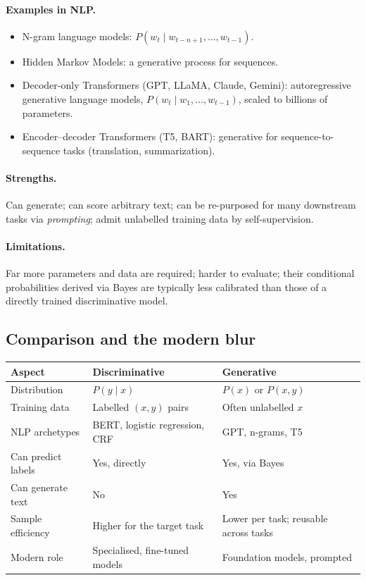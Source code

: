 \documentclass[12pt,a4paper]{report}
\theoremstyle{definition}
\theoremstyle{remark}
\begin{document}
\paragraph{Examples in NLP.}
\begin{itemize}
    \item N-gram language models: $P(w_t \mid w_{t-n+1}, \dots, w_{t-1})$.
    \item Hidden Markov Models: a generative process for sequences.
    \item Decoder-only Transformers (GPT, LLaMA, Claude, Gemini): autoregressive generative language models, $P(w_t \mid w_1, \dots, w_{t-1})$, scaled to billions of parameters.
    \item Encoder--decoder Transformers (T5, BART): generative for sequence-to-sequence tasks (translation, summarization).
\end{itemize}

\paragraph{Strengths.} Can generate; can score arbitrary text; can be re-purposed for many downstream tasks via \emph{prompting}; admit unlabelled training data by self-supervision.

\paragraph{Limitations.} Far more parameters and data are required; harder to evaluate; their conditional probabilities derived via Bayes are typically less calibrated than those of a directly trained discriminative model.

\subsection{Comparison and the modern blur}

\begin{center}
\begin{tabular}{|l|l|l|}
\hline
\textbf{Aspect} & \textbf{Discriminative} & \textbf{Generative} \\
\hline
Distribution & $P(y \mid x)$ & $P(x)$ or $P(x, y)$ \\
Training data & Labelled $(x, y)$ pairs & Often unlabelled $x$ \\
NLP archetypes & BERT, logistic regression, CRF & GPT, n-grams, T5 \\
Can predict labels & Yes, directly & Yes, via Bayes \\
Can generate text & No & Yes \\
Sample efficiency & Higher for the target task & Lower per task; reusable across tasks \\
Modern role & Specialised, fine-tuned models & Foundation models, prompted \\
\hline
\end{tabular}
\end{center}
\end{document}

